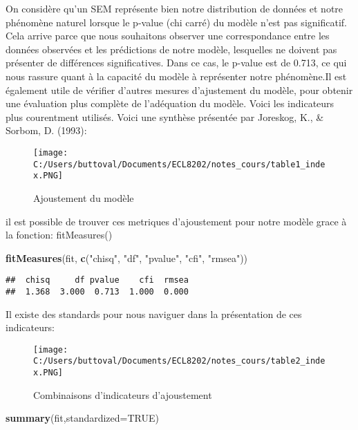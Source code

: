 \documentclass[
]{article}
\newenvironment{Shaded}{\begin{snugshade}}{\end{snugshade}}
\newcommand{\AttributeTok}[1]{\textcolor[rgb]{0.13,0.29,0.53}{#1}}
\newcommand{\ConstantTok}[1]{\textcolor[rgb]{0.56,0.35,0.01}{#1}}
\newcommand{\FunctionTok}[1]{\textcolor[rgb]{0.13,0.29,0.53}{\textbf{#1}}}
\newcommand{\NormalTok}[1]{#1}
\newcommand{\StringTok}[1]{\textcolor[rgb]{0.31,0.60,0.02}{#1}}
\begin{document}
On considère qu'un SEM représente bien notre distribution de données et
notre phénomène naturel lorsque le p-value (chi carré) du modèle n'est
pas significatif. Cela arrive parce que nous souhaitons observer une
correspondance entre les données observées et les prédictions de notre
modèle, lesquelles ne doivent pas présenter de différences
significatives. Dans ce cas, le p-value est de 0.713, ce qui nous
rassure quant à la capacité du modèle à représenter notre phénomène.Il
est également utile de vérifier d'autres mesures d'ajustement du modèle,
pour obtenir une évaluation plus complète de l'adéquation du modèle.
Voici les indicateurs plus courentment utilisés. Voici une synthèse
présentée par Joreskog, K., \& Sorbom, D. (1993):

\begin{figure}
\centering
\texttt{[image: C:/Users/buttoval/Documents/ECL8202/notes\_cours/table1\_index.PNG]}
\caption{Ajoustement du modèle}
\end{figure}

il est possible de trouver ces metriques d'ajoustement pour notre modèle
grace à la fonction: fitMeasures()

\begin{Shaded}
\begin{Highlighting}[]
\FunctionTok{fitMeasures}\NormalTok{(fit, }\FunctionTok{c}\NormalTok{(}\StringTok{"chisq"}\NormalTok{, }\StringTok{"df"}\NormalTok{, }\StringTok{"pvalue"}\NormalTok{, }\StringTok{"cfi"}\NormalTok{, }\StringTok{"rmsea"}\NormalTok{))}
\end{Highlighting}
\end{Shaded}

\begin{verbatim}
##  chisq     df pvalue    cfi  rmsea 
##  1.368  3.000  0.713  1.000  0.000
\end{verbatim}

Il existe des standards pour nous naviguer dans la présentation de ces
indicateurs:

\begin{figure}
\centering
\texttt{[image: C:/Users/buttoval/Documents/ECL8202/notes\_cours/table2\_index.PNG]}
\caption{Combinaisons d'indicateurs d'ajoustement}
\end{figure}

\begin{Shaded}
\begin{Highlighting}[]
\FunctionTok{summary}\NormalTok{(fit,}\AttributeTok{standardized=}\ConstantTok{TRUE}\NormalTok{)}
\end{Highlighting}
\end{Shaded}
\end{document}

